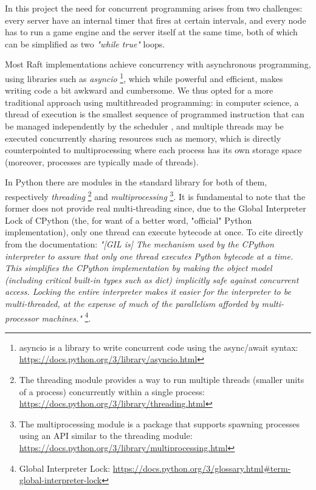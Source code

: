 In this project the need for concurrent programming arises from two challenges: every server have an internal timer that fires at certain intervals, and every node has to run a game engine and the server itself at the same time, both of which can be simplified as two \textit{"while true"} loops. 

Most Raft implementations achieve concurrency with asynchronous programming, using libraries such as \textit{asyncio} \footnote{asyncio is a library to write concurrent code using the async/await syntax: \url{https://docs.python.org/3/library/asyncio.html}}, which while powerful and efficient, makes writing code a bit awkward and cumbersome. We thus opted for a more traditional approach using multithreaded programming: in computer science, a thread of execution is the smallest sequence of programmed instruction that can be managed independently by the scheduler \cite{lamportMultiprocessor}, and multiple threads may be executed concurrently sharing resources such as memory, which is directly counterpointed to multiprocessing where each process has its own storage space (moreover, processes are typically made of threads). 

In Python there are modules in the standard library for both of them, respectively \textit{threading} \footnote{The threading module provides a way to run multiple threads (smaller units of a process) concurrently within a single process: \url{https://docs.python.org/3/library/threading.html}} and \textit{multiprocessing} \footnote{The multiprocessing module is a package that supports spawning processes using an API similar to the threading module: \url{https://docs.python.org/3/library/multiprocessing.html}}. It is fundamental to note that the former does not provide real multi-threading since, due to the Global Interpreter Lock of CPython (the, for want of a better word, "official" Python implementation), only one thread can execute bytecode at once. To cite directly from the documentation: \textit{"[GIL is] The mechanism used by the CPython interpreter to assure that only one thread executes Python bytecode at a time. This simplifies the CPython implementation by making the object model (including critical built-in types such as dict) implicitly safe against concurrent access. Locking the entire interpreter makes it easier for the interpreter to be multi-threaded, at the expense of much of the parallelism afforded by multi-processor machines."} \footnote{Global Interpreter Lock: \url{https://docs.python.org/3/glossary.html\#term-global-interpreter-lock}}.

